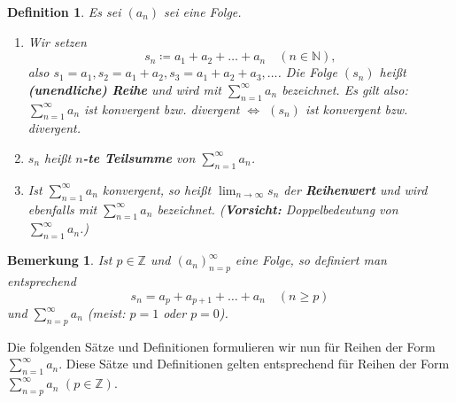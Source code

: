 \documentclass[12pt]{extreport} %
\newcommand{\N}{\mathbb{N}}
\newcommand{\Z}{\mathbb{Z}}
\theoremstyle{named}
\theoremstyle{itshape}
\newtheorem*{definition}{Definition}
\theoremstyle{normal}
\newtheorem*{bemerkung}{Bemerkung}
\begin{document}
     
\begin{definition} Es sei $(a_{n})$ sei eine Folge.
	\begin{enumerate}
		\item Wir setzen
		$$ s_{n} \coloneqq a_{1} + a_{2} + \dotsc + a_{n} \quad (n \in \N), $$
		also $s_{1} = a_{1}, s_{2} = a_{1} + a_{2},  s_{3} = a_{1} + a_{2} + a_3, \dotsc$. Die Folge $(s_{n})$ hei{\ss}t \textbf{(unendliche) Reihe} und wird mit 
		$\sum_{n = 1}^{\infty} a_{n}$ bezeichnet. Es gilt also: \\
		$\sum_{n=1}^{\infty} a_{n}$ ist konvergent bzw. divergent $\iff$ $(s_{n})$ ist konvergent bzw. divergent.
		\item $s_{n}$ hei{\ss}t $n$\textbf{-te Teilsumme} von $\sum_{n=1}^{\infty} a_{n}$.	
		\item Ist $\sum_{n = 1}^{\infty} a_{n}$ konvergent, so hei{\ss}t $\lim_{n \to \infty} s_{n}$ der \textbf{Reihenwert} und wird ebenfalls mit 
		$\sum_{n=1}^{\infty} a_{n}$ bezeichnet. ({\bf Vorsicht:} Doppelbedeutung von $\sum_{n=1}^{\infty} a_{n}$.)
	\end{enumerate} 	
\end{definition}


\begin{bemerkung}
	Ist $p \in \Z$ und $(a_{n})_{n=p}^{\infty}$ eine Folge, so definiert man entsprechend
		$$ s_{n} = a_{p} + a_{p+1} + \dotsc + a_{n} \quad (n \geq p) $$
	und $\sum_{n=p}^{\infty} a_{n}$ (meist: $p = 1$ oder $p = 0$).
\end{bemerkung}


Die folgenden Sätze und Definitionen formulieren wir nun für Reihen der Form $\sum_{n=1}^{\infty} a_{n}$. Diese Sätze und Definitionen gelten entsprechend für Reihen der Form 
$\sum_{n=p}^{\infty} a_{n}$ $(p \in \Z)$.
\end{document}
